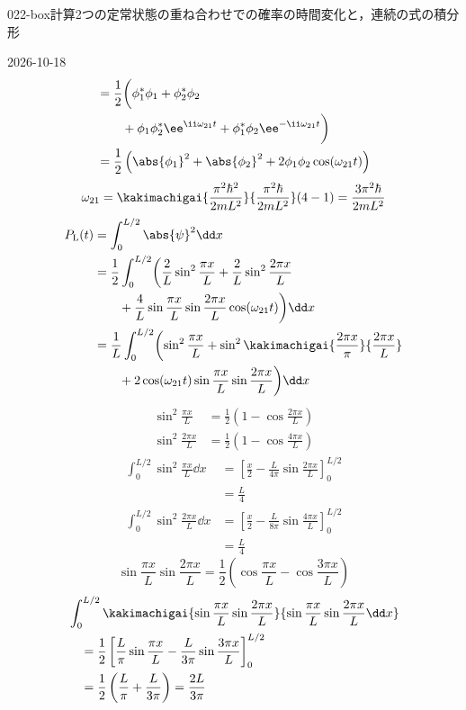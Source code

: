 \documentclass[uplatex,dvipdfmx,a4paper,11pt]{jsarticle}
\begin{document}
\begin{mondai}{022-box}{計算}{2つの定常状態の重ね合わせでの確率の時間変化と，連続の式の積分形}
\begin{kotaeutsushi}{2026-10-18}
\begin{align*}
&=\frac{1}{2}\biggl(\phi_{1}^{*}\phi_{1}+\phi_{2}^{*}\phi_{2}\\
&\qquad+\phi_{1}\phi_{2}^{*}\ee^{\ii\omega_{21}t}+\phi_{1}^{*}\phi_{2}\ee^{-\ii\omega_{21}t}\biggr)\\
&=\frac{1}{2}\left(\abs{\phi_{1}}^{2}+\abs{\phi_{2}}^{2}+2\phi_{1}\phi_{2}\cos(\omega_{21}t)\right)
\end{align*}
\[ \omega_{21}=\kakimachigai{\frac{\pi^{2}\hbar^{2}}{2mL^{2}}}{\frac{\pi^{2}\hbar}{2mL^{2}}}(4-1)=\frac{3\pi^{2}\hbar}{2mL^{2}} \]
\begin{align*}
P_{\mathrm{L}}(t)&=\int_{0}^{L/2}\abs{\psi}^{2}\dd x\\
&=\frac{1}{2}\int_{0}^{L/2}\biggl(\frac{2}{L}\sin^{2}\frac{\pi x}{L}+\frac{2}{L}\sin^{2}\frac{2\pi x}{L}\\
&\qquad+\frac{4}{L}\sin\frac{\pi x}{L}\sin\frac{2\pi x}{L}\cos(\omega_{21}t)\biggr)\dd x\\
&=\frac{1}{L}\int_{0}^{L/2}\biggl(\sin^{2}\frac{\pi x}{L}+\sin^{2}\kakimachigai{\frac{2\pi x}{\pi}}{\frac{2\pi x}{L}}\\
&\qquad+2\cos(\omega_{21}t)\sin\frac{\pi x}{L}\sin\frac{2\pi x}{L}\biggr)\dd x
\end{align*}
\begin{align*}
\sin^{2}\frac{\pi x}{L}&=\frac{1}{2}\left(1-\cos\frac{2\pi x}{L}\right)\\
\sin^{2}\frac{2\pi x}{L}&=\frac{1}{2}\left(1-\cos\frac{4\pi x}{L}\right)
\end{align*}
\begin{align*}
\int_{0}^{L/2}\sin^{2}\frac{\pi x}{L}\dd x&=\left[\frac{x}{2}-\frac{L}{4\pi}\sin\frac{2\pi x}{L}\right]_{0}^{L/2}\\
&=\frac{L}{4}\\
\int_{0}^{L/2}\sin^{2}\frac{2\pi x}{L}\dd x&=\left[\frac{x}{2}-\frac{L}{8\pi}\sin\frac{4\pi x}{L}\right]_{0}^{L/2}\\
&=\frac{L}{4}
\end{align*}
\[ \sin\frac{\pi x}{L}\sin\frac{2\pi x}{L}=\frac{1}{2}\left(\cos\frac{\pi x}{L}-\cos\frac{3\pi x}{L}\right) \]
\begin{align*}
&\int_{0}^{L/2}\kakimachigai{\sin\frac{\pi x}{L}\sin\frac{2\pi x}{L}}{\sin\frac{\pi x}{L}\sin\frac{2\pi x}{L}\dd x}\\
&\quad=\frac{1}{2}\left[\frac{L}{\pi}\sin\frac{\pi x}{L}-\frac{L}{3\pi}\sin\frac{3\pi x}{L}\right]_{0}^{L/2}\\
&\quad=\frac{1}{2}\left(\frac{L}{\pi}+\frac{L}{3\pi}\right)=\frac{2L}{3\pi}

\end{align*}
\end{kotaeutsushi}
\end{mondai}
\end{document}
